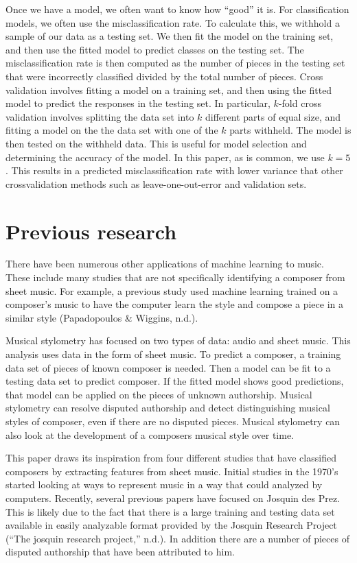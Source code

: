 \documentclass[12pt,twoside]{reedthesis}
\theoremstyle{definition}
\theoremstyle{definition}
\theoremstyle{definition}
\theoremstyle{remark}
\begin{document}
Once we have a model, we often want to know how ``good'' it is. For
classification models, we often use the misclassification rate. To
calculate this, we withhold a sample of our data as a testing set. We
then fit the model on the training set, and then use the fitted model to
predict classes on the testing set. The misclassification rate is then
computed as the number of pieces in the testing set that were
incorrectly classified divided by the total number of pieces. Cross
validation involves fitting a model on a training set, and then using
the fitted model to predict the responses in the testing set. In
particular, \(k\)-fold cross validation involves splitting the data set
into \(k\) different parts of equal size, and fitting a model on the the
data set with one of the \(k\) parts withheld. The model is then tested
on the withheld data. This is useful for model selection and determining
the accuracy of the model. In this paper, as is common, we use
\(k = 5\). This results in a predicted misclassification rate with lower
variance that other crossvalidation methods such as leave-one-out-error
and validation sets.

\section{Previous research}\label{previous-research}

There have been numerous other applications of machine learning to
music. These include many studies that are not specifically identifying
a composer from sheet music. For example, a previous study used machine
learning trained on a composer's music to have the computer learn the
style and compose a piece in a similar style (Papadopoulos \& Wiggins,
n.d.).

Musical stylometry has focused on two types of data: audio and sheet
music. This analysis uses data in the form of sheet music. To predict a
composer, a training data set of pieces of known composer is needed.
Then a model can be fit to a testing data set to predict composer. If
the fitted model shows good predictions, that model can be applied on
the pieces of unknown authorship. Musical stylometry can resolve
disputed authorship and detect distinguishing musical styles of
composer, even if there are no disputed pieces. Musical stylometry can
also look at the development of a composers musical style over time.

This paper draws its inspiration from four different studies that have
classified composers by extracting features from sheet music. Initial
studies in the 1970's started looking at ways to represent music in a
way that could analyzed by computers. Recently, several previous papers
have focused on Josquin des Prez. This is likely due to the fact that
there is a large training and testing data set available in easily
analyzable format provided by the Josquin Research Project (``The
josquin research project,'' n.d.). In addition there are a number of
pieces of disputed authorship that have been attributed to him.
\end{document}
